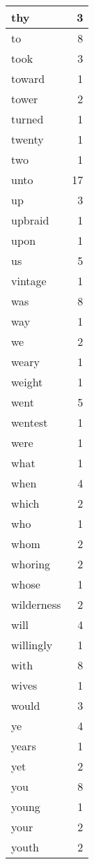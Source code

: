 \begin{center}
\begin{longtable}{l|r}
thy & 3\\ \hline 
to & 8\\ \hline 
took & 3\\ \hline 
toward & 1\\ \hline 
tower & 2\\ \hline 
turned & 1\\ \hline 
twenty & 1\\ \hline 
two & 1\\ \hline 
unto & 17\\ \hline 
up & 3\\ \hline 
upbraid & 1\\ \hline 
upon & 1\\ \hline 
us & 5\\ \hline 
vintage & 1\\ \hline 
was & 8\\ \hline 
way & 1\\ \hline 
we & 2\\ \hline 
weary & 1\\ \hline 
weight & 1\\ \hline 
went & 5\\ \hline 
wentest & 1\\ \hline 
were & 1\\ \hline 
what & 1\\ \hline 
when & 4\\ \hline 
which & 2\\ \hline 
who & 1\\ \hline 
whom & 2\\ \hline 
whoring & 2\\ \hline 
whose & 1\\ \hline 
wilderness & 2\\ \hline 
will & 4\\ \hline 
willingly & 1\\ \hline 
with & 8\\ \hline 
wives & 1\\ \hline 
would & 3\\ \hline 
ye & 4\\ \hline 
years & 1\\ \hline 
yet & 2\\ \hline 
you & 8\\ \hline 
young & 1\\ \hline 
your & 2\\ \hline 
youth & 2\\ \hline 
\end{longtable}
\end{center}



